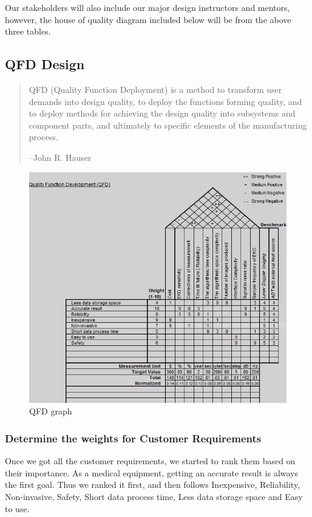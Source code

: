 \documentclass[paper=letter, fontsize=11pt]{scrartcl}
\numberwithin{equation}{section}		%
\numberwithin{figure}{section}			%
\numberwithin{table}{section}			%
\begin{document}
Our stakeholders will also include our major design instructors and mentors, however, the house of quality diagram included below will be from the above three tables.

\subsection{QFD Design}
\begin{quotation}
QFD (Quality Function Deployment) is a method to transform user demands into design quality, to deploy the functions forming quality, and to deploy methods for achieving the design quality into subsystems and component parts, and ultimately to specific elements of the manufacturing process.

\hfill --John R. Hauser
\end{quotation}

\begin{figure}[H]
    \centering
	\includegraphics[scale=1]{qfd.png}
	\caption{QFD graph}
\end{figure}

\subsubsection{Determine the weights for Customer Requirements}
Once we got all the customer requirements, we started to rank them based on their importance. As a medical equipment, getting an accurate result is always the first goal. Thus we ranked it first, and then follows Inexpensive, Reliability, Non-invasive, Safety, Short data process time, Less data storage space and Easy to use.
\end{document}
